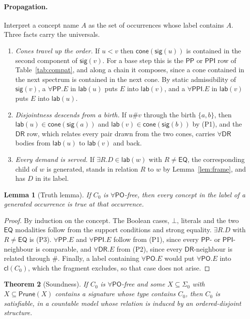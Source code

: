 \documentclass[11pt]{article}
\newcommand{\DR}{\mathsf{DR}}
\newcommand{\PO}{\mathsf{PO}}
\newcommand{\PP}{\mathsf{PP}}
\newcommand{\PPI}{\mathsf{PPI}}
\newcommand{\EQ}{\mathsf{EQ}}
\newcommand{\cl}{\mathsf{cl}}
\newcommand{\cone}{\mathsf{cone}}
\newcommand{\Prune}{\mathsf{Prune}}
\newcommand{\lab}{\mathsf{lab}}
\newcommand{\sig}{\mathsf{sig}}
\theoremstyle{plain}
\newtheorem{theorem}{Theorem}[section]
\newtheorem{lemma}[theorem]{Lemma}
\theoremstyle{definition}
\begin{document}
\paragraph{Propagation.} Interpret a concept name $A$ as the set of occurrences
whose label contains $A$. Three facts carry the universals.
\begin{enumerate}
  \item[(P1)] \emph{Cones travel up the order.} If $u<v$ then
    $\cone(\sig(u))$ is contained in the second component of $\sig(v)$. For a
    base step this is the $\PP$ or $\PPI$ row of Table~\ref{tab:compat}, and
    along a chain it composes, since a cone contained in the next spectrum is
    contained in the next cone. By static admissibility of $\sig(v)$, a
    $\forall\PP.E$ in $\lab(u)$ puts $E$ into $\lab(v)$, and a $\forall\PPI.E$ in
    $\lab(v)$ puts $E$ into $\lab(u)$.
  \item[(P2)] \emph{Disjointness descends from a birth.} If $u\#v$ through the
    birth $\{a,b\}$, then $\lab(u)\in\cone(\sig(a))$ and
    $\lab(v)\in\cone(\sig(b))$ by (P1), and the $\DR$ row, which relates every
    pair drawn from the two cones, carries $\forall\DR$ bodies from $\lab(u)$ to
    $\lab(v)$ and back.
  \item[(P3)] \emph{Every demand is served.} If $\exists R.D\in\lab(w)$ with
    $R\neq\EQ$, the corresponding child of $w$ is generated, stands in relation $R$
    to $w$ by Lemma~\ref{lem:frame}, and has $D$ in its label.
\end{enumerate}

\begin{lemma}[Truth lemma]\label{lem:truth}
If $C_0$ is $\forall\PO$-free, then every concept in the label of a generated
occurrence is true at that occurrence.
\end{lemma}

\begin{proof}
By induction on the concept. The Boolean cases, $\bot$, literals and the two
$\EQ$ modalities follow from the support conditions and strong equality.
$\exists R.D$ with $R\neq\EQ$ is (P3). $\forall\PP.E$ and $\forall\PPI.E$ follow from
(P1), since every $\PP$- or $\PPI$-neighbour is comparable, and $\forall\DR.E$
from (P2), since every $\DR$-neighbour is related through $\#$. Finally, a label
containing $\forall\PO.E$ would put $\forall\PO.E$ into $\cl(C_0)$, which the
fragment excludes, so that case does not arise.
\end{proof}

\begin{theorem}[Soundness]\label{thm:sound}
If $C_0$ is $\forall\PO$-free and some $X\subseteq\Sigma_0$ with
$X\subseteq\Prune(X)$ contains a signature whose type contains $C_0$, then $C_0$
is satisfiable, in a countable model whose relation is induced by an
ordered-disjoint structure.
\end{theorem}
\end{document}
